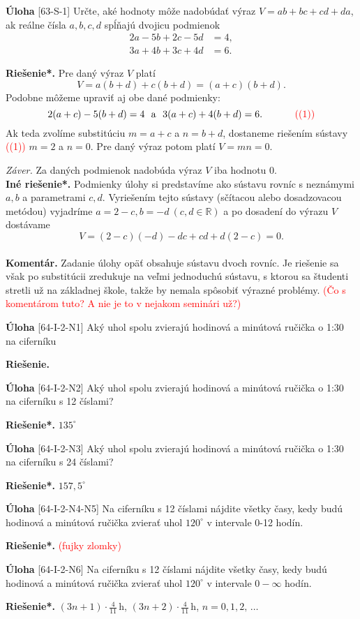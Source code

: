 \documentclass{article}
\newcommand{\RR}{\mathbb{R}}
\newcommand{\kom}{\textbf{Komentár.} }
\newcommand{\rie}{\textbf{Riešenie.} }
\newcommand{\rieh}{\textbf{Riešenie*.} }
\newcommand\todo[1]{\noindent\textcolor{red}{(#1)}}
\newcommand{\problem}[4]{
  \begin{tcolorbox}[breakable,notitle,boxrule=0pt,colback=light-gray,colframe=light-gray]
    \textbf{Úloha}
    [#1] #3
  \end{tcolorbox}
  \noindent#4
}
\begin{document}
\problem{63-S-1}{}{
Určte, aké hodnoty môže nadobúdať výraz $V = ab + bc + cd + da$, ak reálne čísla $a,b, c, d$ spĺňajú dvojicu podmienok
\begin{align*}
2a - 5b + 2c - 5d &= 4,\\
3a + 4b + 3c + 4d &= 6.
\end{align*}
}{
\rieh Pre daný výraz $V$ platí $$V = a(b + d) + c(b + d) = (a + c)(b + d).$$
Podobne môžeme upraviť aj obe dané podmienky: $$2(a + c) - 5(b + d) = 4 \ \ \mathrm{a} \ \  3(a + c) + 4(b + d) = 6.\ \ \  \ \ \ \ \ \ \ \todo{(1)}$$
Ak teda zvolíme substitúciu $m = a + c$ a $n = b + d$, dostaneme riešením sústavy \todo{(1)} $m = 2$ a $n = 0$. Pre daný výraz potom platí $V = mn = 0$.

\textit{Záver.} Za daných podmienok nadobúda výraz $V$ iba hodnotu 0.\\

\textbf{Iné riešenie*.} Podmienky úlohy si predstavíme ako sústavu rovníc s neznámymi $a, b$ a parametrami $c, d$. Vyriešením tejto sústavy (sčítacou alebo dosadzovacou metódou) vyjadríme $a = 2 - c, b = -d \ (c, d \in \RR )$ a po dosadení do výrazu $V$ dostávame $$V = (2 - c)(-d) - dc + cd + d(2 - c) = 0.$$
\\
\kom Zadanie úlohy opäť obsahuje sústavu dvoch rovníc. Je riešenie sa však po substitúcii zredukuje na veľmi jednoduchú sústavu, s ktorou sa študenti stretli už na základnej škole, takže by nemala spôsobiť výrazné problémy.
\todo{Čo s komentárom tuto? A nie je to v nejakom seminári už?}
}


\problem{64-I-2-N1}{}{
Aký uhol spolu zvierajú hodinová a minútová ručička o 1:30 na ciferníku
}{
\rie
}

\problem{64-I-2-N2}{}{
Aký uhol spolu zvierajú hodinová a minútová ručička o 1:30 na ciferníku s 12 číslami?
}{
\rieh $135^{\circ}$
}

\problem{64-I-2-N3}{}{
Aký uhol spolu zvierajú hodinová a minútová ručička o 1:30 na ciferníku s 24 číslami?
}{
\rieh $157,5^{\circ}$
}


\problem{64-I-2-N4-N5}{}{
Na ciferníku s 12 číslami nájdite všetky časy, kedy budú hodinová a minútová ručička zvierať uhol $120^{\circ}$ v intervale 0-12 hodín.
}{
\rieh \todo{fujky zlomky}
}

\problem{64-I-2-N6}{}{
Na ciferníku s 12 číslami nájdite všetky časy, kedy budú hodinová a minútová ručička zvierať uhol $120^{\circ}$ v intervale $0-\infty$ hodín.
}{
\rieh $(3n+1) \cdot \frac{4}{11}$\,h, $(3n+2)\cdot\frac{4}{11}$\,h, $n=0, 1, 2,\,\ldots$
}
\end{document}
